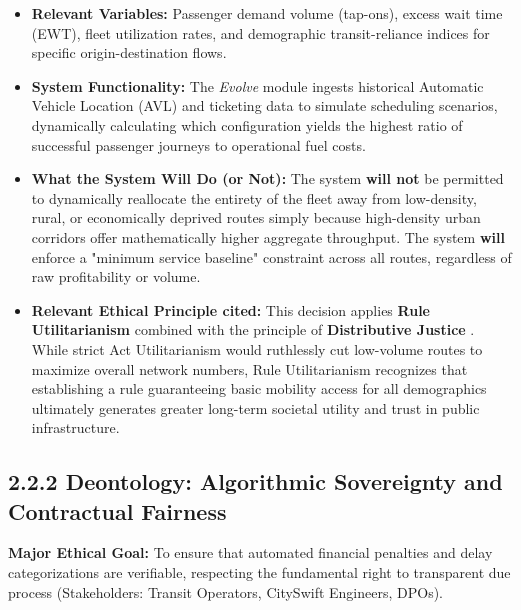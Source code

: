 \documentclass[]
{UCD_CS_41820_Report}
\begin{document}
\begin{itemize}
  \item \textbf{Relevant Variables:} Passenger demand volume (tap-ons), excess wait time (EWT), fleet utilization rates, and demographic transit-reliance indices for specific origin-destination flows.
  \item \textbf{System Functionality:} The \textit{Evolve} module ingests historical Automatic Vehicle Location (AVL) and ticketing data to simulate scheduling scenarios, dynamically calculating which configuration yields the highest ratio of successful passenger journeys to operational fuel costs.
  \item \textbf{What the System Will Do (or Not):} The system \textbf{will not} be permitted to dynamically reallocate the entirety of the fleet away from low-density, rural, or economically deprived routes simply because high-density urban corridors offer mathematically higher aggregate throughput. The system \textbf{will} enforce a "minimum service baseline" constraint across all routes, regardless of raw profitability or volume.
  \item \textbf{Relevant Ethical Principle cited:} This decision applies \textbf{Rule Utilitarianism} combined with the principle of \textbf{Distributive Justice} \cite{intro_machine_ethics}. While strict Act Utilitarianism would ruthlessly cut low-volume routes to maximize overall network numbers, Rule Utilitarianism recognizes that establishing a rule guaranteeing basic mobility access for all demographics ultimately generates greater long-term societal utility and trust in public infrastructure.
\end{itemize}

\subsection*{2.2.2 Deontology: Algorithmic Sovereignty and Contractual Fairness}
\textbf{Major Ethical Goal:} To ensure that automated financial penalties and delay categorizations are verifiable, respecting the fundamental right to transparent due process (Stakeholders: Transit Operators, CitySwift Engineers, DPOs).
\end{document}
